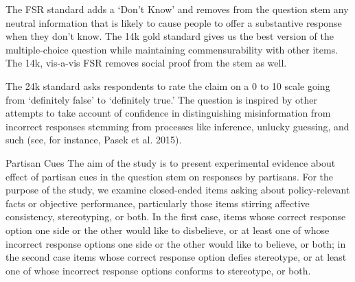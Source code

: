 \documentclass[12pt, letterpaper]{article}
\begin{document}
The FSR standard adds a `Don't Know’ and removes from the question stem any neutral information that is likely to cause people to offer a substantive response when they don't know. The 14k gold standard gives us the best version of the multiple-choice question while maintaining commensurability with other items. The 14k, vis-a-vis FSR removes social proof from the stem as well.

The 24k standard asks respondents to rate the claim on a 0 to 10 scale going from `definitely false' to `definitely true.' The question is inspired by other attempts to take account of confidence in distinguishing misinformation from incorrect responses stemming from processes like inference, unlucky guessing, and such (see, for instance, Pasek et al. 2015).

Partisan Cues
The aim of the study is to present experimental evidence about effect of partisan cues in the question stem on responses by partisans. For the purpose of the study, we examine closed-ended items asking about policy-relevant facts or objective performance, particularly those items stirring affective consistency, stereotyping, or both.  In the first case, items whose correct response option one side or the other would like to disbelieve, or at least one of whose incorrect response options one side or the other would like to believe, or both; in the second case items whose correct response option defies stereotype, or at least one of whose incorrect response options conforms to stereotype, or both.  
\end{document}

